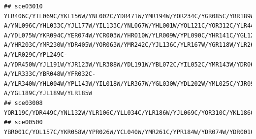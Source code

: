 \documentclass[
]{book}
\begin{document}
\begin{verbatim}
## sce03010 YLR406C/YIL069C/YKL156W/YNL002C/YDR471W/YMR194W/YOR234C/YGR085C/YBR189W/YPL198W/YGR214W/YDL082W/YFL034C-A/YNL096C/YHL033C/YJL177W/YIL133C/YNL067W/YHL001W/YOL121C/YOR312C/YLR448W/YDR025W/YOR293W/YPL079W/YLR061W/YJL190C/YML063W/YDR447C/YGL076C/YDR500C/YLR344W/YLR048W/YER131W/YOR096W/YDR418W/YML026C/YDL083C/YNL301C/YEL054C/YBL027W/YGR148C/YDL136W/YBR181C/YER117W/YMR142C/YNL162W/YML073C/YER102W/YLR325C/YKR057W/YBR191W/YLR441C/YGR034W/YFR031C-A/YDL075W/YKR094C/YER074W/YCR003W/YHR010W/YLR009W/YPL090C/YHR141C/YGL123W/YLL045C/YER056C-A/YHR203C/YMR230W/YDR405W/YOR063W/YMR242C/YJL136C/YLR167W/YGR118W/YLR264W/YNL302C/YPR102C/YKL180W/YPR132W/YBR084C-A/YLR029C/YPL249C-A/YDR450W/YJL191W/YJR123W/YLR388W/YDL191W/YBL072C/YIL052C/YMR143W/YDR064W/YNL178W/YPL081W/YBL087C/YNL069C/YOL127W/YGL031C/YBL092W/YOL120C/YML024W/YPR043W/YJR145C/YOR182C/YDL133C-A/YLR333C/YBR048W/YFR032C-A/YLR340W/YHL004W/YPL143W/YIL018W/YLR367W/YGL030W/YDL202W/YML025C/YJR094W-A/YGL189C/YJL189W/YLR185W
## sce03008                                                                                                                                                                                                                                                                                                                                                                                                                                                                                                                                                                                         YOR119C/YDR449C/YNL132W/YLR106C/YLL034C/YLR186W/YJL069C/YOR310C/YKL186C/YLR175W/YLR197W/YDL014W/YHR170W/YNL282W/YDL208W/YHR089C/YPL093W/YDL166C/YOR056C/YGR030C/YNL075W/YCR057C/YJL109C/YLR222C/YML093W/YHR148W/YGR128C/YOL010W/YLR129W/YLR409C/YLR022C/YHR196W/YDR339C/YPL217C/YMR239C/YBL018C/YOR048C/YDR324C/YLR397C/YGR090W/YBR167C/YEL026W/YPL043W/YNL207W/YBR257W/YDR398W/YJR002W/YGL099W/YIL035C/YNR053C
## sce00500                                                                                                                                                                                                                                                                                                                                                                                                                                                                                                                                                                                                                                                                                                                                                                                                                                                 YBR001C/YOL157C/YKR058W/YPR026W/YCL040W/YMR261C/YPR184W/YDR074W/YDR001C/YBR126C/YKL035W/YDR516C/YEL011W/YLR258W/YFR015C/YMR105C/YPR160W/YML100W/YFR053C

\end{verbatim}
\end{document}
